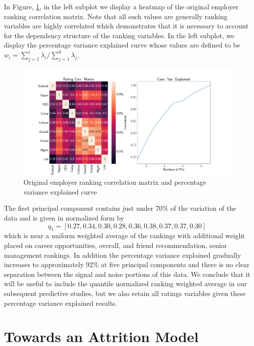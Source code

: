 \documentclass[10pt]{article}
\begin{document}
In Figure, \ref{fig:pcagr}, in the left subplot we display a heatmap of the 
original employer ranking correlation matrix.  Note that all such values 
are generally ranking variables are highly correlated which demonstrates 
that it is necessary to account for the dependency structure of the ranking 
variables.  In the left subplot, we display the percentage variance explained curve 
whose values are defined to be $w_i = \sum_{j=1}^i\lambda_i/\sum_{j=1}^9\lambda_j$. 
%
\begin{figure}[thb]
    \centering
	\includegraphics[width=1.0\linewidth]{pcagr.pdf}
	\caption{Original employer ranking correlation matrix and percentage variance 
    explained curve}
	\label{fig:pcagr}
\end{figure}
%
The first principal component contains just under 70\% of the variation of the data 
and is given in normalized form by  
%
\begin{equation}
    q_1 = [0.27,0.34,0.30,0.28,0.36,0.38,0.37,0.37,0.30] 
\end{equation}
%
which is near a uniform weighted average of the rankings with additional 
weight placed on career opportunities, overall, and friend recommendation, 
senior management rankings. In addition the percentage variance explained 
gradually increases to approximately 92\% at five principal components and 
there is no clear separation between the signal and noise portions of this data.
We conclude that it will be useful to include the quantile normalized 
ranking weighted average in our subsequent predictive studies, but we 
also retain all ratings variables given these percentage variance explained results. 

\section{Towards an Attrition Model}\label{modsec}
\end{document}
